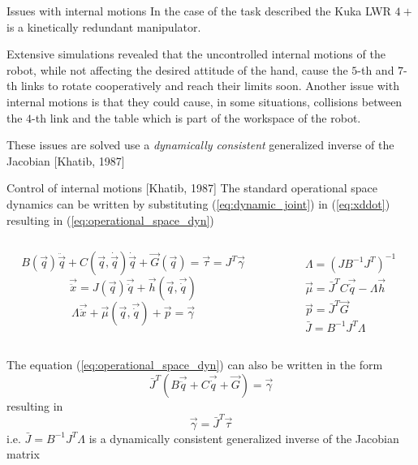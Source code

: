 \begin{frame}{Issues with internal motions}
  In the case of the task described the Kuka LWR $4+$ is a kinetically redundant manipulator.
  \par
  Extensive simulations revealed
  that the uncontrolled internal motions of the robot, while not affecting the
  desired attitude of the hand, cause the $5$-th and $7$-th links to rotate
  cooperatively and reach their limits soon. Another issue with internal motions
  is that they could cause, in some situations, collisions between the $4$-th
  link and the table which is part of the workspace of the robot.
  \par
  These issues are solved use a \emph{dynamically consistent} generalized inverse of the Jacobian [Khatib, 1987]
\end{frame}
  
\begin{frame}{Control of internal motions [Khatib, 1987]}
  The standard operational space dynamics can be written by substituting
  (\ref{eq:dynamic_joint}) in (\ref{eq:xddot}) resulting in (\ref{eq:operational_space_dyn})
  \begin{columns}
    \begin{column}{0.7\columnwidth}
      \begin{equation}\label{eq:dynamic_joint}
      B(\vec{q}) \ddot{\vec{q}} + C(\vec{q}, \dot{\vec{q}}) \dot{\vec{q}} + \vec{G}(\vec{q}) = \vec{\tau} = J^{T} \vec{\gamma}
      \end{equation}
      \begin{equation}\label{eq:xddot}
        \vec{\ddot{x}} = J(\vec{q}) \vec{\ddot{q}} + \vec{h}(\vec{q},\vec{\dot{q}})
      \end{equation}
      \begin{equation}\label{eq:operational_space_dyn}
        \Lambda \vec{\ddot{x}} + \vec{\mu}(\vec{q}, \vec{\dot{q}}) + \vec{p} = \vec{\gamma}
      \end{equation}
    \end{column}
    \begin{column}{0.4\columnwidth}
      \[
      \begin{split}
        &\Lambda = (J B^{-1} J^{T})^{-1}\\
        &\vec{\mu} = \bar{J}^{T} C \vec{\dot{q}} - \Lambda \vec{h}\\
        &\vec{p} = \bar{J}^T \vec{G}\\
        &\bar{J} = B^{-1} J^{T} \Lambda
      \end{split}
      \]
    \end{column}
  \end{columns}
The equation (\ref{eq:operational_space_dyn}) can also be written in the form
\[
\bar{J}^{T} (B \vec{\ddot{q}} + C \vec{\dot{q}} + \vec{G}) = \vec{\gamma}
\]
resulting in 
\[
\vec{\gamma} = \bar{J}^{T} \vec{\tau}
\]
i.e. $\bar{J} = B^{-1} J^{T} \Lambda$ is a dynamically consistent generalized inverse of the Jacobian matrix
\end{frame}

